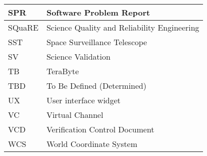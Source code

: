 \begin{longtable}{|l|p{}|}
SPR&Software Problem Report \\\hline
SQuaRE&Science Quality and Reliability Engineering \\\hline
SST&Space Surveillance Telescope \\\hline
SV&Science Validation \\\hline
TB&TeraByte \\\hline
TBD&To Be Defined (Determined) \\\hline
UX&User interface widget \\\hline
VC&Virtual Channel \\\hline
VCD&Verification Control Document \\\hline
WCS&World Coordinate System \\\hline
\end{longtable} 

